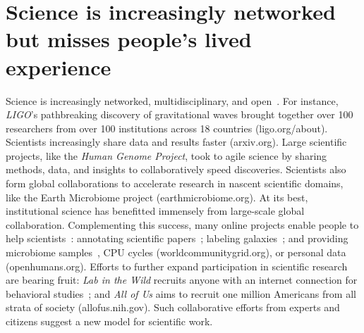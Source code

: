 \vspace{0.25in}

\section{Science is increasingly networked but misses people’s lived experience }
Science is increasingly networked, multidisciplinary, and
open~\cite{Pandey2017}. For instance, \textit{LIGO}’s pathbreaking discovery of
gravitational waves brought together over 100 researchers
from over 100 institutions across 18 countries (ligo.org/about). 
Scientists increasingly share data and results faster (arxiv.org). 
Large scientific projects, like the \textit{Human Genome Project}, 
took to agile science by sharing methods, data, and insights to 
collaboratively speed discoveries. Scientists also form global 
collaborations to accelerate research in nascent scientific domains, 
like the Earth Microbiome project (earthmicrobiome.org).
At its best, institutional science has benefitted immensely
from large-scale global collaboration. Complementing this success,
many online projects enable people to help scientists~\cite{Nielsen2012}: annotating 
scientific papers~\cite{Good2013}; labeling galaxies~\cite{JordanRaddick2013}; and providing microbiome 
samples~\cite{McDonald2018}, CPU cycles (worldcommunitygrid.org), or personal data (openhumans.org). 
Efforts to further expand participation in scientific research are bearing fruit: \textit{Lab in the Wild} 
recruits anyone with an internet connection for behavioral studies~\cite{Reinecke2015}; and \textit{All of Us} aims 
to recruit one million Americans from all strata of society (allofus.nih.gov). Such collaborative efforts from experts 
and citizens suggest a new model for scientific work.

